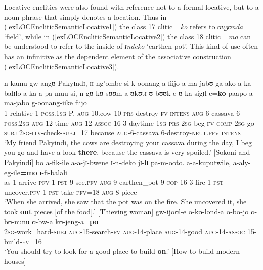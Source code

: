 Locative enclitics were also found with reference not to a formal locative, but to a noun phrase that simply denotes a location. Thus in (\ref{exLOCEncliticSemanticLocative1}) the class 17 clitic =\textit{ko} refers to \textit{ʊn̩gʊnda} \lq field', while in (\ref{exLOCEncliticSemanticLocative2}) the class 18 clitic \mbox{=\textit{mo}} can be understood to refer to the inside of \textit{ɪndeko} `earthen pot'. This kind of use often has an infinitive as the dependent element of the associative construction (\ref{exLOCEncliticSemanticLocative3}).
\begin{exe}
	\ex \label{exLOCEncliticSemanticLocative1} \gll n-kamu gw-angʊ Pakyɪndɪ, ɪɪ-ng’ombe si-k-oonang-a fiijo a-ma-jabʊ ga-ako a-ka-balɪlo a-ka-a pa-muu-si, n-gʊ-kʊ-sʊʊm-a ʊkʊtɪ ʊ-bʊʊk-e ʊ-ka-sigɪl-e=\textbf{ko} paapo a-ma-jabʊ g-oonang-iike fiijo\\
	1-relative 1-\textsc{poss.1sg} P. \textsc{aug}-10.cow 10-\textsc{prs}-destroy-\textsc{fv} \textsc{intens} \textsc{aug}-6-cassava 6-\textsc{poss.2sg} \textsc{aug}-12-time \textsc{aug}-12-\textsc{assoc} 16-3-daytime \textsc{1sg}-\textsc{prs}-\textsc{2sg}-beg-\textsc{fv} \textsc{comp} \textsc{2sg}-go-\textsc{subj} \textsc{2sg}-\textsc{itv}-check-\textsc{subj}=17 because \textsc{aug}-6-cassava 6-destroy-\textsc{neut.pfv} \textsc{intens}\\
	\glt `My friend Pakyindi, the cows are destroying your cassava during the day, I beg you go and have a look \textbf{there}, because the cassava is very spoiled.' [Sokoni and Pakyindi]
	\ex \label{exLOCEncliticSemanticLocative2}
	\gll bo a-fik-ile a-a-jɪ-bwene ɪ-n-deko jɪ-lɪ pa-m-ooto. a-a-kuputwile, a-aly-eg-ile\textbf{=mo} ɪ-fi-balali\\
	as 1-arrive-\textsc{pfv} 1-\textsc{pst}-9-see.\textsc{pfv} \textsc{aug}-9-earthen\_pot 9-\textsc{cop} 16-3-fire 1-\textsc{pst}-uncover.\textsc{pfv} 1-\textsc{pst}-take-\textsc{pfv}=18 \textsc{aug}-8-piece\\
	\glt `When she arrived, she saw that the pot was on the fire. She uncovered it, she took \textbf{out} pieces [of the food].' [Thieving woman]
	\ex \label{exLOCEncliticSemanticLocative3}\gll gw-ijʊʊl-e ʊ-kʊ-lond-a ʊ-bʊ-jo ʊ-bʊ-nunu ʊ-bw-a kʊ-jeng-a=\textbf{po}\\
	\textsc{2sg}-work\_hard-\textsc{subj} \textsc{aug}-15-search-\textsc{fv} \textsc{aug}-14-place \textsc{aug}-14-good \textsc{aug}-14-\textsc{assoc} 15-build-\textsc{fv}=16\\
	\glt `You should try to look for a good place to build \textbf{on}.' [How to build modern houses]
\end{exe}

